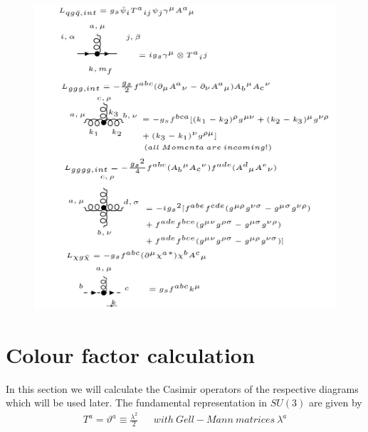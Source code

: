 \begin{figure}[h!]
\hspace{-1cm}
\includegraphics[scale=0.7]{images/Intro/Lint.png}
\end{figure}

\pagebreak

\section{Colour factor calculation}
In this section we will calculate the Casimir operators of the respective diagrams which will be used later. The fundamental representation in $ SU(3) $ are given by\cite{Schwartz:2013pla, Platzer:2018pmd}
\begin{equation}
\begin{split}
T^a = \vartheta^a \equiv \frac{\lambda ^2}{2} \:\:\:\:\:\:\: \mathit{with\: Gell-Mann\: matrices\: \lambda ^a}
\end{split}
\end{equation}

